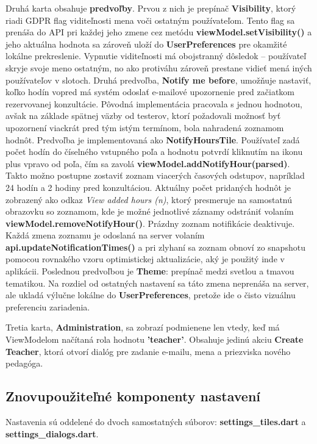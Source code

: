 Druhá karta obsahuje \textbf{predvoľby}. Prvou z nich je prepínač 
\textbf{Visibility}, ktorý riadi GDPR flag viditeľnosti mena 
voči ostatným používateľom. Tento flag sa prenáša do API pri každej 
jeho zmene cez metódu \textbf{viewModel.setVisibility()} a jeho aktuálna 
hodnota sa zároveň uloží do \textbf{UserPreferences} pre okamžité 
lokálne prekreslenie. Vypnutie viditeľnosti má obojstranný dôsledok – 
používateľ skryje svoje meno ostatným, no ako protiváhu zároveň prestane 
vidieť mená iných používateľov v slotoch. Druhá predvoľba, \textbf{Notify me before}, umožňuje nastaviť,
koľko hodín vopred má systém odoslať e-mailové upozornenie
pred začiatkom rezervovanej konzultácie. Pôvodná implementácia
pracovala s jednou hodnotou, avšak na základe spätnej väzby
od testerov, ktorí požadovali možnosť byť upozornení viackrát
pred tým istým termínom, bola nahradená zoznamom hodnôt.
Predvoľba je implementovaná ako
\textbf{NotifyHoursTile}.
Používateľ zadá počet hodín do číselného vstupného poľa
a hodnotu potvrdí kliknutím na ikonu plus vpravo od poľa,
čím sa zavolá \textbf{viewModel.addNotifyHour(parsed)}.
Takto možno postupne zostaviť zoznam viacerých časových odstupov,
napríklad 24 hodín a 2 hodiny pred konzultáciou.
Aktuálny počet pridaných hodnôt je zobrazený ako odkaz
\textit{View added hours (n)}, ktorý presmeruje na samostatnú
obrazovku so zoznamom, kde je možné jednotlivé záznamy odstrániť
volaním \textbf{viewModel.removeNotifyHour()}. Prázdny zoznam
notifikácie deaktivuje. Každá zmena zoznamu je odoslaná na server volaním \textbf{api.updateNotificationTimes()}
a pri zlyhaní sa zoznam obnoví zo snapshotu pomocou rovnakého
vzoru optimistickej aktualizácie, aký je použitý inde v aplikácii.
Poslednou predvoľbou je \textbf{Theme}: prepínač medzi svetlou 
a tmavou tematikou. Na rozdiel od ostatných nastavení sa táto 
zmena neprenáša na server, ale ukladá výlučne lokálne 
do \textbf{UserPreferences}, pretože ide o čisto vizuálnu preferenciu zariadenia.

Tretia karta, \textbf{Administration}, sa zobrazí podmienene 
len vtedy, keď má ViewModelom načítaná rola hodnotu \textbf{'teacher'}. Obsahuje jedinú akciu 
\textbf{Create Teacher}, ktorá otvorí dialóg pre zadanie e-mailu, 
mena a priezviska nového pedagóga.

\subsection{Znovupoužiteľné komponenty nastavení}
Nastavenia sú oddelené do dvoch 
samostatných súborov: \textbf{settings\_tiles.dart} a \textbf{settings\-\_dialogs.dart}. 


